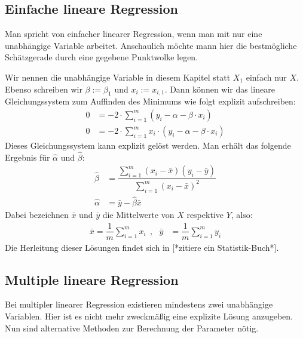 \subsection{Einfache lineare Regression}
\label{subsection:2:1:1}

Man spricht von einfacher linearer Regression, wenn man mit nur eine unabhängige Variable arbeitet. Anschaulich möchte mann hier die bestmögliche Schätzgerade durch eine gegebene Punktwolke legen.

Wir nennen die unabhängige Variable in diesem Kapitel statt $X_1$ einfach nur $X$. Ebenso schreiben wir $\beta := \beta_1$ und $x_i := x_{i, 1}$. Dann können wir das lineare Gleichungssystem zum Auffinden des Minimums wie folgt explizit aufschreiben:
\begin{align*}
    0 &= - 2 \cdot \sum_{i=1}^m (y_i - \alpha - \beta \cdot x_i)\\
    0 &= - 2 \cdot \sum_{i=1}^m x_i \cdot (y_i - \alpha - \beta \cdot x_i)
\end{align*}
Dieses Gleichungssystem kann explizit gelöst werden. Man erhält das folgende Ergebnis für $\hat\alpha$ und $\hat\beta$:
\begin{align*}
    \hat\beta &= \dfrac{\sum\limits_{i=1}^m (x_i - \bar x)(y_i - \bar y)}{\sum\limits_{i=1}^m (x_i - \bar x)^2}\\
    \hat\alpha &= \bar y - \hat\beta \bar x
\end{align*}
Dabei bezeichnen $\bar x$ und $\bar y$ die Mittelwerte von $X$ respektive $Y$, also:
\begin{align*}
    \bar x = \dfrac{1}{m} \sum_{i=1}^m x_i ~~,~~~ \bar y &= \dfrac{1}{m} \sum_{i=1}^m y_i
\end{align*}
Die Herleitung dieser Lösungen findet sich in [*zitiere ein Statistik-Buch*].

\subsection{Multiple lineare Regression}
\label{subsection:2:1:2}

Bei multipler linearer Regression existieren mindestens zwei unabhängige Variablen. Hier ist es nicht mehr zweckmäßig eine explizite Lösung anzugeben. Nun sind alternative Methoden zur Berechnung der Parameter nötig.

